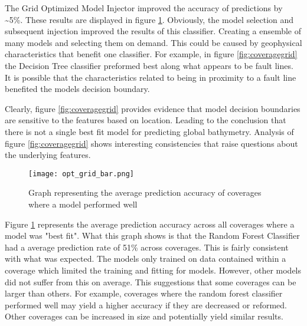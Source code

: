 \par
The Grid Optimized Model Injector improved the accuracy of predictions by \~{}5\%.
These results are displayed in figure \ref{fig:grid_opt_graph}.
Obviously, the model selection and subsequent injection improved the results of this classifier.
Creating a ensemble of many models and selecting them on demand.
This could be caused by geophysical characteristics that benefit one classifier.
For example, in figure \ref{fig:coveragegrid} the Decision Tree classifier preformed best along what appears to be fault lines.
It is possible that the characteristics related to being in proximity to a fault line benefited the models decision boundary. 

\par
Clearly, figure \ref{fig:coveragegrid} provides evidence that model decision boundaries are sensitive to the features based on location.
Leading to the conclusion that there is not a single best fit model for predicting global bathymetry.
Analysis of figure \ref{fig:coveragegrid} shows interesting consistencies that raise questions about the underlying features.

\begin{figure}[h]
    \centering
    \texttt{[image: opt\_grid\_bar.png]}
    \caption{Graph representing the average prediction accuracy of coverages where a model performed well}
    \label{fig:grid_opt_graph}
\end{figure}

\par
Figure \ref{fig:grid_opt_graph} represents the average prediction accuracy across all coverages where a model was "best fit".
What this graph shows is that the Random Forest Classifier had a average prediction rate of 51\% across coverages.
This is fairly consistent with what was expected. 
The models only trained on data contained within a coverage which limited the training and fitting for models. 
However, other models did not suffer from this on average.
This suggestions that some coverages can be larger than others.
For example, coverages where the random forest classifier performed well may yield a higher accuracy if they are decreased or reformed.
Other coverages can be increased in size and potentially yield similar results.

